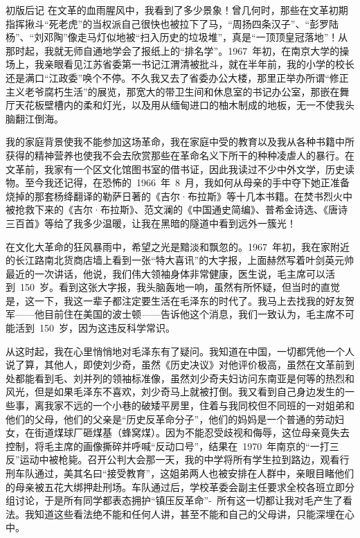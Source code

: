 \begin{pre-post-text}{初版后记}
在文革的血雨腥风中，我看到了多少景象！曾几何时，那些在文革初期指挥揪斗“死老虎”的当权派自己很快也被拉下了马，“周扬四条汉子”、“彭罗陆杨”、“刘邓陶”像走马灯似地被“扫入历史的垃圾堆”，真是“一顶顶皇冠落地”！从那时起，我就无师自通地学会了报纸上的“排名学”。1967~年初，在南京大学的操场上，我亲眼看见江苏省委第一书记江渭清被批斗，就在半年前，我的小学的校长还是满口“江政委”唤个不停。不久我又去了省委办公大楼，那里正举办所谓“修正主义老爷腐朽生活”的展览，那宽大的带卫生间和休息室的书记办公室，那嵌在舞厅天花板壁槽内的柔和灯光，以及用从缅甸进口的柚木制成的地板，无一不使我头脑翻江倒海。

我的家庭背景使我不能参加这场革命，我在家庭中受的教育以及我从各种书籍中所获得的精神营养也使我不会去欣赏那些在革命名义下所干的种种凌虐人的暴行。在文革前，我家有一个区文化馆图书室的借书证，因此我读过不少中外文学，历史读物。至今我还记得，在恐怖的~1966~年~8~月，我如何从母亲的手中夺下她正准备烧掉的那套杨绛翻译的勒萨日著的《吉尔·布拉斯》等十几本书籍。在焚书烈火中被抢救下来的《吉尔·布拉斯》、范文澜的《中国通史简编》、普希金诗选、《唐诗三百首》等给了我多少温暖，让我在黑暗的隧道中看到远外一簇光！

在文化大革命的狂风暴雨中，希望之光是黯淡和飘忽的。1967~年初，我在家附近的长江路南北货商店墙上看到一张“特大喜讯”的大字报，上面赫然写着叶剑英元帅最近的一次讲话，他说，我们伟大领袖身体非常健康，医生说，毛主席可以活到~150~岁。看到这张大字报，我头脑轰地一响，虽然有所怀疑，但当时的直觉是，这一下，我这一辈子都注定要生活在毛泽东的时代了。我马上去找我的好友贺军——他目前住在美国的波士顿——告诉他这个消息，我们一致认为，毛主席不可能活到~150~岁，因为这违反科学常识。

从这时起，我在心里悄悄地对毛泽东有了疑问。我知道在中国，一切都凭他一个人说了算，其他人，即使刘少奇，虽然《历史决议》对他评价极高，虽然在文革前到处都能看到毛、刘并列的领袖标准像，虽然刘少奇夫妇访问东南亚是何等的热烈和风光，但是如果毛泽东不喜欢，刘少奇马上就被打倒。我又看到自己身边发生的一些事，离我家不远的一个小巷的破矮平房里，住着与我同校但不同班的一对姐弟和他们的父母，他们的父亲是“历史反革命分子”，他们的妈妈是一个普通的劳动妇女，在街道煤球厂砸煤基（蜂窝煤）。因为不能忍受歧视和侮辱，这位母亲竟失去控制，将毛主席的画像撕碎并呼喊“反动口号”，结果在~1970~年南京的“一打三反”运动中被枪毙。召开公判大会那一天，我的中学将所有学生拉到路边，观看行刑车队通过，美其名曰“接受教育”，这姐弟两人也被安排在人群中，亲眼目睹他们的母亲被五花大绑押赴刑场。车队通过后，学校革委会副主任要求全校各班立即分组讨论，于是所有同学都表态拥护“镇压反革命”-~所有这一切都让我对毛产生了看法。我知道这些看法绝不能和任何人讲，甚至不能和自己的父母讲，只能深埋在心中。


\end{pre-post-text}
